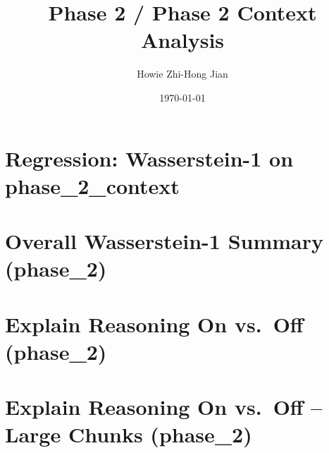 \documentclass[11pt]{article}
\title{Phase 2 / Phase 2 Context Analysis}
\author{Howie Zhi-Hong Jian}
\date{\today}
\begin{document}
\maketitle

\section{Regression: Wasserstein-1 on phase\_2\_context}
\begin{table}[H]
\centering
\caption{Regression of Wasserstein-1 on elicitation mode, observed context-incentive prompt-condition cells, and controls (phase\_2\_context). Column (1) is OLS; column (2) is a fractional logit (GLM, Binomial, logit link) with HC1 robust standard errors.}
\label{tab:regression-w1-p2c}

\end{table}

\section{Overall Wasserstein-1 Summary (phase\_2)}
\begin{table}[H]
\centering
\caption{Summary statistics of Wasserstein-1 by Mode and ChunkN over phase\_2 behavioral games (Explain Reasoning = True, Extra Flag = []).}
\label{tab:w1-overall-p2}

\end{table}

\section{Explain Reasoning On vs.\ Off (phase\_2)}
\begin{table}[H]
\centering
\caption{Wasserstein-1 with Explain Reasoning on vs.\ off, restricted to Gemini-3 Flash and Qwen3-235 over ChunkN $\in \{1, 10, 20, 25\}$.}
\label{tab:w1-reasoning-p2}

\end{table}

\section{Explain Reasoning On vs.\ Off -- Large Chunks (phase\_2)}
\begin{table}[H]
\centering
\caption{Wasserstein-1 with Explain Reasoning on vs.\ off on phase\_2 behavioral games for ChunkN $\in \{50, 100\}$, grouped by ChunkN, Explain Reasoning, SplitN, and Reasoning Mode (chunk elicitation only). All LLM models included.}
\label{tab:w1-reasoning-large-chunks-p2}

\end{table}
\end{document}
